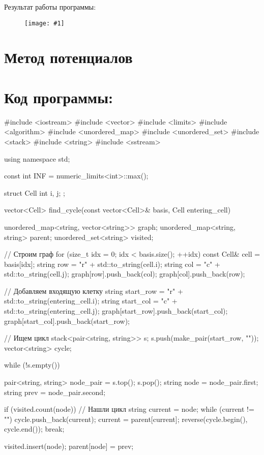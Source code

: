 \documentclass{report}
\newcommand{\drawzalupa}[2]{
	\begin{figure}[H]
		\centering
		\texttt{[image: \#1]}
	\end{figure}
}
\begin{document}
	Результат работы программы:
	
	\drawzalupa{images/task1.png}{1}
	
	\newpage
	
	\section{Метод потенциалов}
	
	\section{Код программы:}
	
	\begin{code}
#include <iostream>
#include <vector>
#include <limits>
#include <algorithm>
#include <unordered_map>
#include <unordered_set>
#include <stack>
#include <string>
#include <sstream>

using namespace std;

const int INF = numeric_limits<int>::max();

struct Cell {
	int i, j;
};

vector<Cell> find_cycle(const vector<Cell>& basis, Cell entering_cell) {
	unordered_map<string, vector<string>> graph;
	unordered_map<string, string> parent;
	unordered_set<string> visited;
	
	// Строим граф
	for (size_t idx = 0; idx < basis.size(); ++idx) {
		const Cell& cell = basis[idx];
		string row = "r" + std::to_string(cell.i);
		string col = "c" + std::to_string(cell.j);
		graph[row].push_back(col);
		graph[col].push_back(row);
	}
	
	// Добавляем входящую клетку
	string start_row = "r" + std::to_string(entering_cell.i);
	string start_col = "c" + std::to_string(entering_cell.j);
	graph[start_row].push_back(start_col);
	graph[start_col].push_back(start_row);
	
	// Ищем цикл
	stack<pair<string, string>> s;
	s.push(make_pair(start_row, ""));
	vector<string> cycle;
	
	while (!s.empty()) {
		pair<string, string> node_pair = s.top();
		s.pop();
		string node = node_pair.first;
		string prev = node_pair.second;
		
		if (visited.count(node)) {
			// Нашли цикл
			string current = node;
			while (current != "") {
				cycle.push_back(current);
				current = parent[current];
			}
			reverse(cycle.begin(), cycle.end());
			break;
		}
		
		visited.insert(node);
		parent[node] = prev;
		
}}
\end{code}
\end{document}
